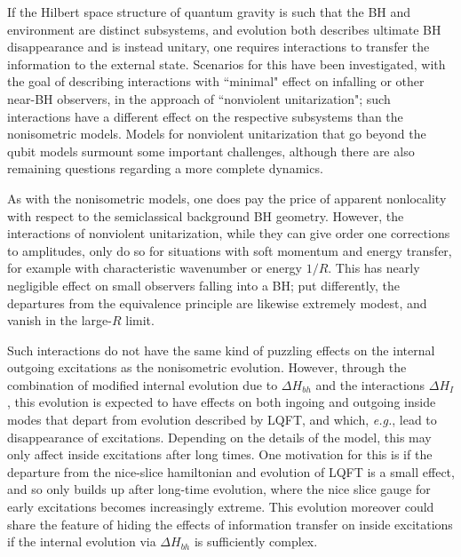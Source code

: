 \documentclass[11pt]{article}
\numberwithin{equation}{section}
\begin{document}
If the Hilbert space structure of quantum gravity is such that the BH and environment are distinct subsystems, and evolution both describes ultimate BH disappearance and is instead unitary, one requires\cite{BHthm} interactions to transfer the information to the external state.  Scenarios for this have been investigated, with the goal of describing interactions with ``minimal" effect on infalling or other near-BH observers, in the approach of 
``nonviolent unitarization"\cite{SGmodels,NVNL,NVUEFT,NVNLT}\cite{NVU,BHQU};
such interactions have a different effect on the respective subsystems than the nonisometric models.  
Models for nonviolent unitarization that go beyond the qubit models surmount some important challenges, although there are also remaining questions regarding a more complete dynamics.  

As with the nonisometric models, one does pay the price of apparent nonlocality with respect to the semiclassical background BH geometry.  However, the interactions of nonviolent unitarization, while they can give order one corrections to amplitudes, only do so for situations with soft momentum and energy transfer, for example with characteristic wavenumber or energy $1/R$.  This has nearly negligible effect on small observers falling into a BH; put differently, the departures from the equivalence principle are likewise extremely modest, and vanish in the large-$R$ limit.

Such interactions do not have the same kind of puzzling effects on the internal outgoing excitations as the nonisometric evolution.  However, through the combination of modified internal evolution due to $\Delta H_{bh}$ and the interactions $\Delta H_I$, this evolution is expected to have effects on  both ingoing and outgoing inside modes that depart from evolution described by LQFT, and which, {\it e.g.}, lead to disappearance of excitations.  Depending on the details of the model, this may only affect inside excitations after long times.  One motivation for this is if the departure from the nice-slice hamiltonian and evolution of LQFT is a small effect, and so only builds up after long-time evolution, where the nice slice gauge for early excitations becomes increasingly extreme.
This evolution moreover could share the feature of hiding the effects of information transfer\cite{AEHPV} on inside excitations if the internal evolution via $\Delta H_{bh}$ is sufficiently complex.   
\end{document}
